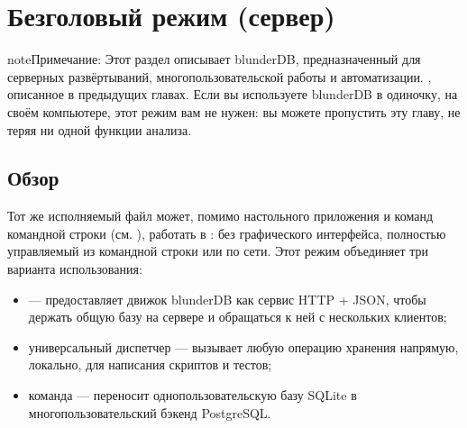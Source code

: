 \documentclass[letterpaper,10pt,russian]{sphinxmanual}
\begin{document}
\sphinxstepscope


\section{Безголовый режим (сервер)}
\label{\detokenize{mode_headless:mode-headless-serveur}}\label{\detokenize{mode_headless:headless}}\label{\detokenize{mode_headless::doc}}
\begin{sphinxadmonition}{note}{Примечание:}
\sphinxAtStartPar
Этот раздел описывает  blunderDB, предназначенный для серверных развёртываний, многопользовательской работы и автоматизации. , описанное в предыдущих главах. Если вы используете blunderDB в одиночку, на своём компьютере, этот режим вам не нужен: вы можете пропустить эту главу, не теряя ни одной функции анализа.
\end{sphinxadmonition}


\subsection{Обзор}
\label{\detokenize{mode_headless:vue-d-ensemble}}
\sphinxAtStartPar
Тот же исполняемый файл  может, помимо настольного приложения и команд командной строки (см. {\hyperref[\detokenize{cli:cli}]{}}), работать в : без графического интерфейса, полностью управляемый из командной строки или по сети. Этот режим объединяет три варианта использования:
\begin{itemize}
\item {} 
\sphinxAtStartPar
{}  — предоставляет движок blunderDB как сервис HTTP + JSON, чтобы держать общую базу на сервере и обращаться к ней с нескольких клиентов;

\item {} 
\sphinxAtStartPar
универсальный диспетчер  — вызывает любую операцию хранения напрямую, локально, для написания скриптов и тестов;

\item {} 
\sphinxAtStartPar
команда  — переносит однопользовательскую базу SQLite в многопользовательский бэкенд PostgreSQL.

\end{itemize}
\end{document}
